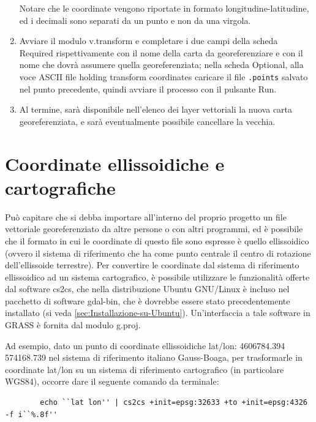 \begin{enumerate}
		Notare che le coordinate vengono riportate in formato longitudine-latitudine, ed i decimali sono separati da un punto e non da una virgola.

		\item Avviare il modulo \textsf{v.transform} e completare i due campi della scheda \textsf{Required} rispettivamente con il nome della carta da georeferenziare e con il nome che dovrà assumere quella georeferenziata; nella scheda \textsf{Optional}, alla voce ASCII file holding transform coordinates caricare il file \texttt{.points} salvato nel punto precedente, quindi avviare il processo con il pulsante \textsf{Run}.
		
		\item Al termine, sarà disponibile nell'elenco dei layer vettoriali la nuova carta georeferenziata, e sarà eventualmente possibile cancellare la vecchia.
	
	\end{enumerate}

	
	
\section{Coordinate ellissoidiche e cartografiche\label{sec:Coordinate-ellissoidiche-e}}
	Può capitare che si debba importare all'interno del proprio progetto un file vettoriale georeferenziato da altre persone o con altri programmi, ed è possibile che il formato in cui le coordinate di questo file sono espresse è quello ellissoidico (ovvero il sistema di riferimento che ha come punto centrale il centro di rotazione dell'ellissoide terrestre). Per convertire le coordinate dal sistema di riferimento ellissoidico ad un sistema cartografico, è possibile utilizzare le funzionalità offerte dal software \textsf{cs2cs}, che nella distribuzione Ubuntu GNU/Linux è incluso nel pacchetto di software \textsf{gdal-bin}, che è dovrebbe essere stato precedentemente installato (si veda \textsection\ref{sec:Installazione-su-Ubuntu}). Un'interfaccia a tale software in GRASS è fornita dal modulo \textsf{g.proj}.

	Ad esempio, dato un punto di coordinate ellissoidiche lat/lon: 4606784.394 574168.739 nel sistema di riferimento italiano Gauss-Boaga, per trasformarle in coordinate lat/lon su un sistema di riferimento cartografico (in particolare WGS84), occorre dare il seguente comando da terminale:
	
	\begin{Verbatim}
		echo ``lat lon'' | cs2cs +init=epsg:32633 +to +init=epsg:4326 -f i``%.8f''
	\end{Verbatim}
	
